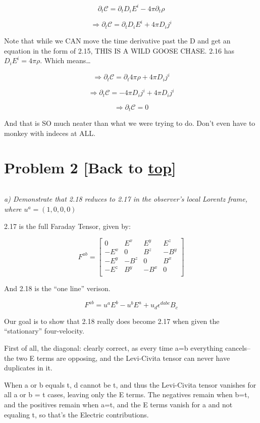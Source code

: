 \documentclass[landscape,letterpaper,10pt,english]{article}
\begin{document}
\[ \partial_t \mathcal C = \partial_t D_i E^i - 4\pi \partial_t \rho \]

\[ \Rightarrow \partial_t \mathcal C = \partial_t D_i E^i + 4\pi D_i j^i \]

    Note that while we CAN move the time derivative past the D and get an
equation in the form of 2.15, THIS IS A WILD GOOSE CHASE. 2.16 has
\(D_i E^i = 4\pi \rho\). Which means\ldots{}

\[ \Rightarrow \partial_t \mathcal C = \partial_t 4\pi \rho + 4\pi D_i j^i \]

\[ \Rightarrow \partial_t \mathcal C = - 4\pi D_i j^i + 4\pi D_i j^i \]

\[ \Rightarrow \partial_t \mathcal C = 0 \]

And that is SO much neater than what we were trying to do. Don't even
have to monkey with indeces at ALL.

    \hypertarget{problem-2-back-to-top}{%
\section{\texorpdfstring{Problem 2 {[}Back to
\hyperref[toc]{top}{]}}{Problem 2 {[}Back to {]}}}\label{problem-2-back-to-top}}

\[\label{P2}\]

\emph{a) Demonstrate that 2.18 reduces to 2.17 in the observer's local
Lorentz frame, where \(u^a = (1,0,0,0)\)}

    2.17 is the full Faraday Tensor, given by:

\[ F^{ab} = \begin{bmatrix}
0 & E^x & E^y & E^z \\
-E^x & 0 & B^z & -B^y \\
-E^y & -B^z & 0 & B^x \\
-E^z & B^y & -B^x & 0 \\
\end{bmatrix}
\]

And 2.18 is the ``one line'' verison.

\[ F^{ab} = u^aE^b - u^bE^a + u_d\epsilon^{dabc} B_c \]

Our goal is to show that 2.18 really does become 2.17 when given the
``stationary'' four-velocity.

    First of all, the diagonal: clearly correct, as every time a=b
everything cancels--the two E terms are opposing, and the Levi-Civita
tensor can never have duplicates in it.

When a or b equals t, d cannot be t, and thus the Levi-Civita tensor
vanishes for all a or b = t cases, leaving only the E terms. The
negatives remain when b=t, and the positives remain when a=t, and the E
terms vanish for a and not equaling t, so that's the Electric
contributions.
\end{document}
